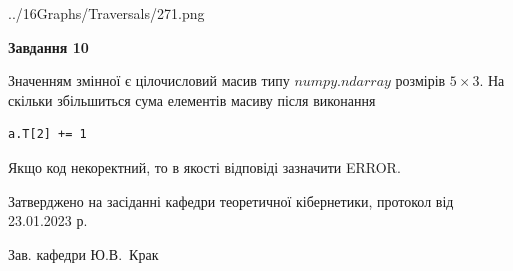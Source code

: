 \documentclass[12pt, ukrainian]{article}
\begin{document}
{\begin {large}
\begin{center}
	{../16Graphs/Traversals/271.png}
\end{center}\par
\newpage

{\begin {center}\textbf{Завдання 10}\end {center}}\par
Значенням змінної  є цілочисловий масив типу $numpy.ndarray$ розмірів $5{\times}3$. На скільки збільшиться сума елементів масиву  після виконання
\begin{verbatim}
a.T[2] += 1
\end{verbatim}


Якщо код некоректний, то в якості відповіді зазначити ERROR.\par
\newpage


\end {large}
}
{\smallskip \begin {small} Затверджено на засіданні кафедри теоретичної кібернетики, протокол  від   23.01.2023 р.\par\smallskip\smallskip
{\parbox {6.5 cm}{Зав. кафедри \dotfill Ю.В.~Крак}} \end{small}}
\end{document}
